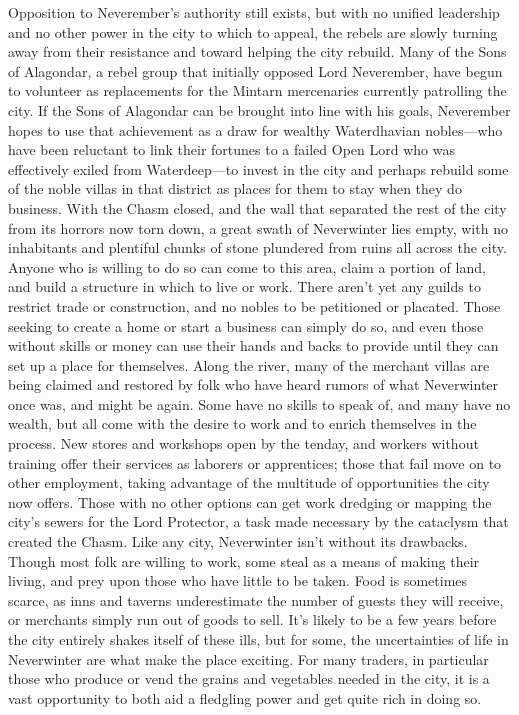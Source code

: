 \documentclass[10pt,a4paper,twoside,twocolumn,openany,bg=print,nodeprecatedcode]{dndbook}
\begin{document}
Opposition to Neverember's authority still exists, but with no unified leadership and no other power in the city to which to appeal, the rebels are slowly turning away from their resistance and toward helping the city rebuild. Many of the Sons of Alagondar, a rebel group that initially opposed Lord Neverember, have begun to volunteer as replacements for the Mintarn mercenaries currently patrolling the city. If the Sons of Alagondar can be brought into line with his goals, Neverember hopes to use that achievement as a draw for wealthy Waterdhavian nobles—who have been reluctant to link their fortunes to a failed Open Lord who was effectively exiled from Waterdeep—to invest in the city and perhaps rebuild some of the noble villas in that district as places for them to stay when they do business.
With the Chasm closed, and the wall that separated the rest of the city from its horrors now torn down, a great swath of Neverwinter lies empty, with no inhabitants and plentiful chunks of stone plundered from ruins all across the city. Anyone who is willing to do so can come to this area, claim a portion of land, and build a structure in which to live or work. There aren't yet any guilds to restrict trade or construction, and no nobles to be petitioned or placated. Those seeking to create a home or start a business can simply do so, and even those without skills or money can use their hands and backs to provide until they can set up a place for themselves.
Along the river, many of the merchant villas are being claimed and restored by folk who have heard rumors of what Neverwinter once was, and might be again. Some have no skills to speak of, and many have no wealth, but all come with the desire to work and to enrich themselves in the process. New stores and workshops open by the tenday, and workers without training offer their services as laborers or apprentices; those that fail move on to other employment, taking advantage of the multitude of opportunities the city now offers. Those with no other options can get work dredging or mapping the city's sewers for the Lord Protector, a task made necessary by the cataclysm that created the Chasm.
Like any city, Neverwinter isn't without its drawbacks. Though most folk are willing to work, some steal as a means of making their living, and prey upon those who have little to be taken. Food is sometimes scarce, as inns and taverns underestimate the number of guests they will receive, or merchants simply run out of goods to sell. It's likely to be a few years before the city entirely shakes itself of these ills, but for some, the uncertainties of life in Neverwinter are what make the place exciting. For many traders, in particular those who produce or vend the grains and vegetables needed in the city, it is a vast opportunity to both aid a fledgling power and get quite rich in doing so.
\end{document}
